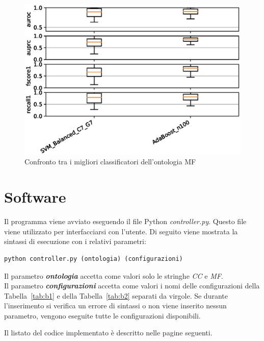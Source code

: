 \documentclass[12pt,a4paper,oneside,hidelinks]{report}
\begin{document}
\begin{figure}[hb]%
    \centering
    \includegraphics[scale = 0.80]{MF-level3.eps}%
    \caption{Confronto tra i migliori classificatori dell'ontologia MF}%
    \label{figure:liv31}%
\end{figure}

\vspace*{\fill}


\appendix
\chapter{Software}
Il programma viene avviato eseguendo il file Python \textit{controller.py}. Questo file viene utilizzato per interfacciarsi con l'utente.
Di seguito viene mostrata la sintassi di esecuzione con i relativi parametri:

\begin{lstlisting}
python controller.py (ontologia) (configurazioni)
\end{lstlisting}
Il parametro \textbf{\textit{ontologia}} accetta come valori solo le stringhe \textit{CC} e \textit{MF}. \\
Il parametro \textbf{\textit{configurazioni}} accetta come valori i nomi delle configurazioni della Tabella~\ref{tab:b1} e della Tabella~\ref{tab:b2} separati da virgole. Se durante l'inserimento si verifica un errore di sintassi o non viene inserito nessun parametro, vengono eseguite tutte le configurazioni disponibili.

Il listato del codice implementato è descritto nelle pagine seguenti.

\newpage

\lstset{style=customp}



\newpage



\newpage


\end{document}
